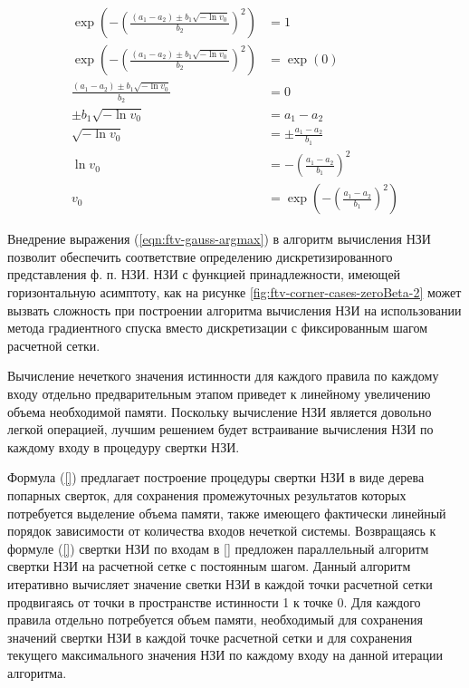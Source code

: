 \begin{align}
	\exp\left(-\left(\frac{(a_1-a_2)\pm b_1\sqrt{-\ln v_0}}{b_2}\right)^2\right) &= 1 \nonumber \\
	\exp\left(-\left(\frac{(a_1-a_2)\pm b_1\sqrt{-\ln v_0}}{b_2}\right)^2\right) &= \exp(0) \nonumber \\
	\frac{(a_1-a_2)\pm b_1\sqrt{-\ln v_0}}{b_2} &= 0 \nonumber \\
	\pm b_1\sqrt{-\ln v_0} &= a_1-a_2 \nonumber \\
	\sqrt{-\ln v_0} &= \pm\frac{a_1-a_2}{b_1} \nonumber \\
	\ln v_0 &= -\left(\frac{a_1-a_2}{b_1}\right)^2 \nonumber \\
	v_0 &= \exp\left(-\left(\frac{a_1-a_2}{b_1}\right)^2\right) \label{eqn:ftv-gauss-argmax}
\end{align}

Внедрение выражения (\ref{eqn:ftv-gauss-argmax}) в алгоритм вычисления НЗИ позволит обеспечить соответствие определению дискретизированного представления ф. п. НЗИ.  НЗИ с функцией принадлежности, имеющей горизонтальную асимптоту, как на рисунке \cref{fig:ftv-corner-cases-zeroBeta-2} может вызвать сложность при построении алгоритма вычисления НЗИ на использовании метода градиентного спуска вместо дискретизации с фиксированным шагом расчетной сетки.

Вычисление нечеткого значения истинности для каждого правила по каждому входу отдельно предварительным этапом приведет к линейному увеличению объема необходимой памяти. Поскольку вычисление НЗИ является довольно легкой операцией, лучшим решением будет встраивание вычисления НЗИ по каждому входу в процедуру свертки НЗИ.

Формула (\ref{}) предлагает построение процедуры свертки НЗИ в виде дерева попарных сверток, для сохранения промежуточных результатов которых потребуется выделение объема памяти, также имеющего фактически линейный порядок зависимости от количества входов нечеткой системы. Возвращаясь к формуле (\ref{}) свертки НЗИ по входам в [] предложен параллельный алгоритм свертки НЗИ на расчетной сетке с постоянным шагом. Данный алгоритм итеративно вычисляет значение светки НЗИ в каждой точки расчетной сетки продвигаясь от точки в пространстве истинности 1 к точке 0. Для каждого правила отдельно потребуется объем памяти, необходимый для сохранения значений свертки НЗИ в каждой точке расчетной сетки и для сохранения текущего максимального значения НЗИ по каждому входу на данной итерации алгоритма.

